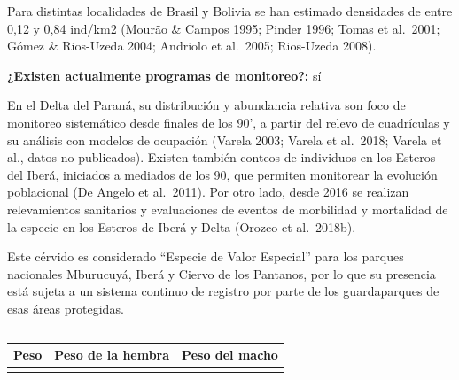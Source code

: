 \documentclass[
  x11names]{article}
\begin{document}
Para distintas localidades de Brasil y Bolivia se han estimado
densidades de entre 0,12 y 0,84 ind/km2 (Mourão \& Campos 1995; Pinder
1996; Tomas et al.~2001; Gómez \& Rios-Uzeda 2004; Andriolo et al.~2005;
Rios-Uzeda 2008).

\textbf{¿Existen actualmente programas de monitoreo?:} sí

En el Delta del Paraná, su distribución y abundancia relativa son foco
de monitoreo sistemático desde finales de los 90', a partir del relevo
de cuadrículas y su análisis con modelos de ocupación (Varela 2003;
Varela et al.~2018; Varela et al., datos no publicados). Existen también
conteos de individuos en los Esteros del Iberá, iniciados a mediados de
los 90, que permiten monitorear la evolución poblacional (De Angelo et
al.~2011). Por otro lado, desde 2016 se realizan relevamientos
sanitarios y evaluaciones de eventos de morbilidad y mortalidad de la
especie en los Esteros de Iberá y Delta (Orozco et al.~2018b).

Este cérvido es considerado ``Especie de Valor Especial'' para los
parques nacionales Mburucuyá, Iberá y Ciervo de los Pantanos, por lo que
su presencia está sujeta a un sistema continuo de registro por parte de
los guardaparques de esas áreas protegidas.


%
\begin{table}[H]
\centering
\begin{tabular}[t]{>{\raggedright\arraybackslash}m{16cm}>{}m{16cm}}
\toprule
\cellcolor{ceil}{\textcolor{white}{\textbf{\rule{0pt}{14pt}DATOS MORFOMÉTRICOS}}}\\
\bottomrule
\end{tabular}
\end{table}

\vspace{-0.4cm}

\begin{tabu} to 
\toprule
\textbf{Peso} & \textbf{Peso de la hembra} & \textbf{Peso del macho}\\
\midrule
{} &  & \\
\bottomrule
\end{tabu}

\end{document}
